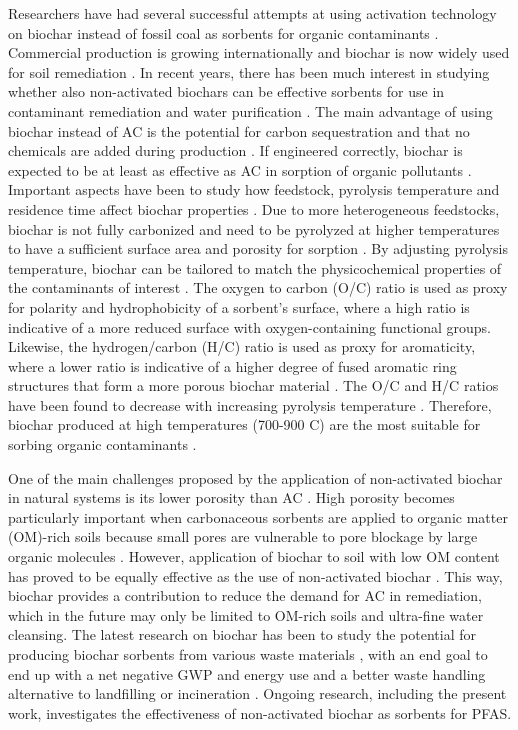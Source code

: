 Researchers have had several successful attempts at using activation technology on biochar instead of fossil coal as sorbents for organic contaminants \citep{Sormo2021}. Commercial production is growing internationally and biochar is now widely used for soil remediation \citep{hagemann2018activated}. In recent years, there has been much interest in studying whether also non-activated biochars can be effective sorbents for use in contaminant remediation and water purification \citep{hagemann2018activated}. The main advantage of using biochar instead of AC is the potential for carbon sequestration and that no chemicals are added during production \citep{hagemann2018activated}. If engineered correctly, biochar is expected to be at least as effective as AC in sorption of organic pollutants \citep{Sormo2021}. Important aspects have been to study how feedstock, pyrolysis temperature and residence time affect biochar properties \citep{Hale2016}. Due to more heterogeneous feedstocks, biochar is not fully carbonized and need to be pyrolyzed at higher temperatures to have a sufficient surface area and porosity for sorption \citep{beesley2011review}. By adjusting pyrolysis temperature, biochar can be tailored to match the physicochemical properties of the contaminants of interest \citep{Hale2016}. The oxygen to carbon (O/C) ratio is used as proxy for polarity and hydrophobicity of a sorbent's surface, where a high ratio is indicative of a more reduced surface with oxygen-containing functional groups. Likewise, the hydrogen/carbon (H/C) ratio is used as proxy for aromaticity, where a lower ratio is indicative of a higher degree of fused aromatic ring structures that form a more porous biochar material \citep{Ahmad2014}. The O/C and H/C ratios have been found to decrease with increasing pyrolysis temperature \citep{Hale2016}. Therefore, biochar produced at high temperatures (700-900 \textdegree C) are the most suitable for sorbing organic contaminants \citep{Figueiredo2018}. 

One of the main challenges proposed by the application of non-activated biochar in natural systems is its lower porosity than AC \citep{leng2021overview}. High porosity becomes particularly important when carbonaceous sorbents are applied to organic matter (OM)-rich soils because small pores are vulnerable to pore blockage by large organic molecules \citep{Sorengard2019}. However, application of biochar to soil with low OM content has proved to be equally effective as the use of non-activated biochar \citep{Alhashimi2017}. This way, biochar provides a contribution to reduce the demand for AC in remediation, which in the future may only be limited to OM-rich soils and ultra-fine water cleansing. The latest research on biochar has been to study the potential for producing biochar sorbents from various waste materials \citep{Cornelissen2011Capping, Kupryianchyk2016b, Sormo2021, zhou2010sorption}, with an end goal to end up with a net negative GWP and energy use and a better waste handling alternative to landfilling or incineration \citep{Alhashimi2017}. Ongoing research, including the present work, investigates the effectiveness of non-activated biochar as sorbents for PFAS. 


